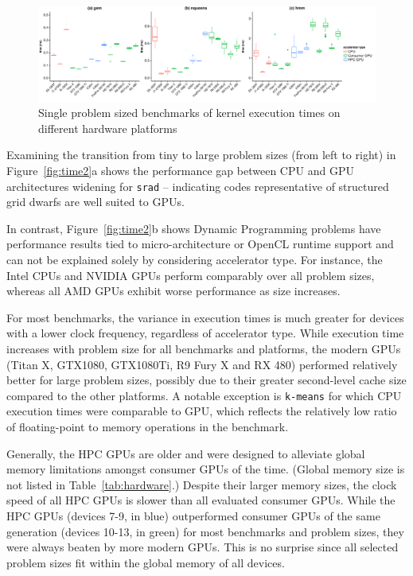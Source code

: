\documentclass[../document.tex]{subfiles}
\begin{document}
\begin{figure}
    \centering
    \includegraphics[width=\textwidth,keepaspectratio]{figures/new-time-results/generate_main_2x3_bandwplot}
    \caption{Single problem sized benchmarks of kernel execution times on different hardware platforms}
    \label{fig:time3}
\end{figure}


Examining the transition from tiny to large problem sizes (from left to right) in Figure~\ref{fig:time2}a shows the performance gap between CPU and GPU architectures widening for {\tt srad} -- indicating codes representative of structured grid dwarfs are well suited to GPUs.

In contrast, Figure~\ref{fig:time2}b shows Dynamic Programming problems have performance results tied to micro-architecture or OpenCL runtime support and can not be explained solely by considering accelerator type.
For instance, the Intel CPUs and NVIDIA GPUs perform comparably over all problem sizes, whereas all AMD GPUs exhibit worse performance as size increases.

For most benchmarks, the variance in execution times is much greater for devices with a lower clock frequency, regardless of accelerator type.
While execution time increases with problem size for all benchmarks and platforms, the modern GPUs (Titan X, GTX1080, GTX1080Ti, R9 Fury X and RX 480) performed relatively better for large problem sizes, possibly due to their greater second-level cache size compared to the other platforms.
A notable exception is {\tt k-means} for which CPU execution times were comparable to GPU, which reflects the relatively low ratio of floating-point to memory operations in the benchmark.

Generally, the HPC GPUs are older and were designed to alleviate global memory limitations amongst consumer GPUs of the time.
(Global memory size is not listed in Table~\ref{tab:hardware}.)
Despite their larger memory sizes, the clock speed of all HPC GPUs is slower than all evaluated consumer GPUs.
While the HPC GPUs (devices 7-9, in blue) outperformed consumer GPUs of the same generation (devices 10-13, in green) for most benchmarks and problem sizes, they were always beaten by more modern GPUs.
This is no surprise since all selected problem sizes fit within the global memory of all devices.
\end{document}
